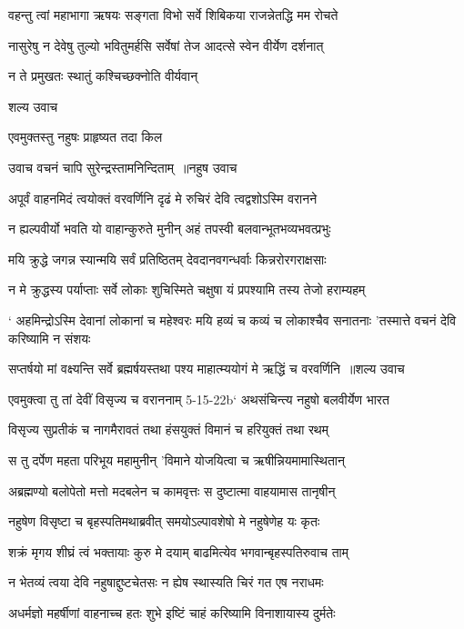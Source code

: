 \twolineshloka
{वहन्तु त्वां महाभागा ऋषयः सङ्गता विभो}
{सर्वे शिबिकया राजन्नेतद्धि मम रोचते}


\twolineshloka
{नासुरेषु न देवेषु तुल्यो भवितुमर्हसि}
{सर्वेषां तेज आदत्से स्वेन वीर्येण दर्शनात्}


न ते प्रमुखतः स्थातुं कश्चिच्छक्नोति वीर्यवान्

शल्य उवाच

एवमुक्तस्तु नहुषः प्राहृष्यत तदा किल

उवाच वचनं चापि सुरेन्द्रस्तामनिन्दिताम् ॥नहुष उवाच


\twolineshloka
{अपूर्वं वाहनमिदं त्वयोक्तं वरवर्णिनि}
{दृढं मे रुचिरं देवि त्वद्वशोऽस्मि वरानने}


\twolineshloka
{न ह्यल्पवीर्यो भवति यो वाहान्कुरुते मुनीन्}
{अहं तपस्वी बलवान्भूतभव्यभवत्प्रभुः}


\twolineshloka
{मयि क्रुद्धे जगन्न स्यान्मयि सर्वं प्रतिष्ठितम्}
{देवदानवगन्धर्वाः किन्नरोरगराक्षसाः}


\twolineshloka
{न मे क्रुद्धस्य पर्याप्ताः सर्वे लोकाः शुचिस्मिते}
{चक्षुषा यं प्रपश्यामि तस्य तेजो हराम्यहम्}


\threelineshloka
{` अहमिन्द्रोऽस्मि देवानां लोकानां च महेश्वरः}
{मयि हव्यं च कव्यं च लोकाश्चैव सनातनाः}
{'तस्मात्ते वचनं देवि करिष्यामि न संशयः}


\threelineshloka
{सप्तर्षयो मां वक्ष्यन्ति सर्वे ब्रह्मर्षयस्तथा}
{पश्य माहात्म्ययोगं मे ऋद्धिं च वरवर्णिनि ॥शल्य उवाच}
{}


\twolineshloka
{एवमुक्त्वा तु तां देवीं विसृज्य च वराननाम्}
{5-15-22b` अथसंचिन्त्य नहुषो बलवीर्येण भारत}


\twolineshloka
{विसृज्य सुप्रतीकं च नागमैरावतं तथा}
{हंसयुक्तं विमानं च हरियुक्तं तथा रथम्}


\twolineshloka
{स तु दर्पेण महता परिभूय महामुनीन्}
{'विमाने योजयित्वा च ऋषीन्नियमामास्थितान्}


\twolineshloka
{अब्रह्मण्यो बलोपेतो मत्तो मदबलेन च}
{कामवृत्तः स दुष्टात्मा वाहयामास तानृषीन्}


\twolineshloka
{नहुषेण विसृष्टा च बृहस्पतिमथाब्रवीत्}
{समयोऽल्पावशेषो मे नहुषेणेह यः कृतः}


\twolineshloka
{शक्रं मृगय शीघ्रं त्वं भक्तायाः कुरु मे दयाम्}
{बाढमित्येव भगवान्बृहस्पतिरुवाच ताम्}


\twolineshloka
{न भेतव्यं त्वया देवि नहुषाद्दुष्टचेतसः}
{न ह्येष स्थास्यति चिरं गत एष नराधमः}


\twolineshloka
{अधर्मज्ञो महर्षीणां वाहनाच्च हतः शुभे}
{इष्टिं चाहं करिष्यामि विनाशायास्य दुर्मतेः}


